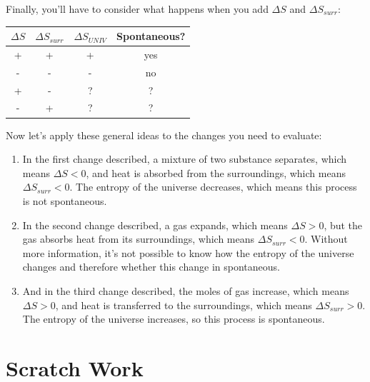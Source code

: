 \documentclass{article}  %
\begin{document}
Finally, you'll have to consider what happens when you add $\Delta S$ and $\Delta S_{surr}$:
\begin{center}
    \begin{tabular}{| c | c | c | c |}
        $\Delta S$ & $\Delta S_{surr}$ & $\Delta S_{UNIV}$ & Spontaneous?  \\
        \hline
        + & + & + & yes  \\
        - & - & - & no \\
        + & - & ? & ? \\
        - & + & ? & ? 
    \end{tabular}
\end{center}
Now let's apply these general ideas to the changes you need to evaluate: 
\begin{enumerate}
    \item In the first change described, a mixture of two substance separates, which means $\Delta S < 0$, and heat is absorbed from the surroundings, which means $\Delta S_{surr} < 0$. The entropy of the universe decreases, which means this process is not spontaneous.
    \item In the second change described, a gas expands, which means $\Delta S > 0$, but the gas absorbs heat from its surroundings, which means $\Delta S_{surr} < 0$. Without more information, it's not possible to know how the entropy of the universe changes and therefore whether this change in spontaneous.
    \item And in the third change described, the moles of gas increase, which means $\Delta S > 0$, and heat is transferred to the surroundings, which means $\Delta S_{surr} > 0$. The entropy of the universe increases, so this process is spontaneous.
\end{enumerate}








\newpage
\section*{Scratch Work}
\end{document}
